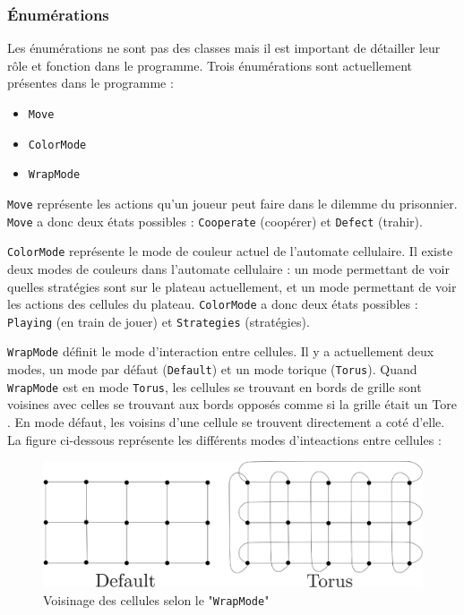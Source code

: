 \documentclass[a4paper, french]{article}
\begin{document}
\pagebreak
\subsubsection{Énumérations}
Les énumérations ne sont pas des classes mais il est important de détailler leur rôle et fonction dans le programme. Trois énumérations sont actuellement présentes dans le programme :

\begin{itemize}
    \item \texttt{Move}
    \item \texttt{ColorMode}
    \item \texttt{WrapMode}
\end{itemize}

\texttt{Move} représente les actions qu'un joueur peut faire dans le dilemme du prisonnier. \texttt{Move} a donc deux états possibles : \texttt{Cooperate} (coopérer) et \texttt{Defect} (trahir).

\texttt{ColorMode} représente le mode de couleur actuel de l'automate cellulaire. Il existe deux modes de couleurs dans l'automate cellulaire : un mode permettant de voir quelles stratégies sont sur le plateau actuellement, et un mode permettant de voir les actions des cellules du plateau. \texttt{ColorMode} a donc deux états possibles : \texttt{Playing} (en train de jouer) et \texttt{Strategies} (stratégies).

\texttt{WrapMode} définit le mode d'interaction entre cellules. Il y a actuellement deux modes, un mode par défaut (\texttt{Default}) et un mode torique (\texttt{Torus}). Quand \texttt{WrapMode} est en mode \texttt{Torus}, les cellules se trouvant en bords de grille sont voisines avec celles se trouvant aux bords opposés comme si la grille était un Tore \cite{Torus}. En mode défaut, les voisins d'une cellule se trouvent directement a coté d'elle. La figure ci-dessous représente les différents modes d'inteactions entre cellules :

\begin{figure}[htp]
    \centering
    \includegraphics[width=\linewidth]{wrapmode.png}
    \caption{Voisinage des cellules selon le "\texttt{WrapMode}"}
\end{figure}
\end{document}
